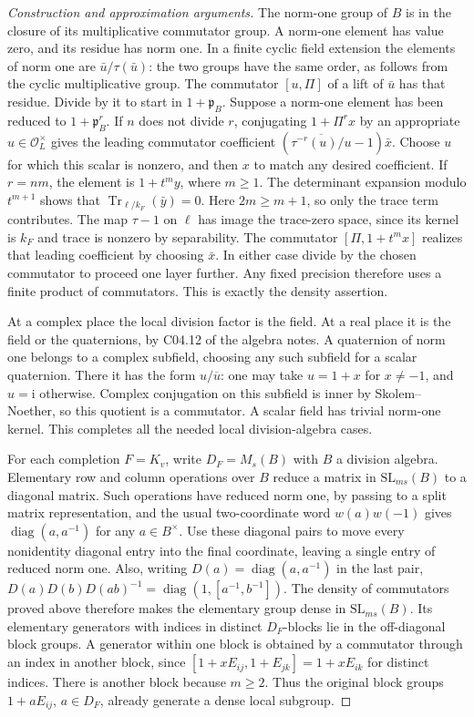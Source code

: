 \documentclass[11pt,a4paper,openany,oneside]{book}
\theoremstyle{resultstyle}
\theoremstyle{definition}
\numberwithin{equation}{chapter}
\newcommand{\SL}{\mathrm{SL}}
\begin{document}
\begin{proof}[Construction and approximation arguments]
The norm-one group of \(B\) is in the closure of its
multiplicative commutator group. A norm-one element has
value zero, and its residue has norm one. In a finite
cyclic field extension the elements of norm one are
\(\bar u/\tau(\bar u)\): the two groups have the same
order, as follows from the cyclic multiplicative group.
The commutator \([u,\Pi]\) of a lift of \(\bar u\)
has that residue. Divide by it to start in
\(1+\mathfrak p_B\). Suppose a norm-one element has
been reduced to \(1+\mathfrak p_B^r\). If \(n\) does
not divide \(r\), conjugating \(1+\Pi^r x\) by an
appropriate \(u\in\mathcal O_L^\times\) gives the
leading commutator coefficient
\((\overline{\tau^{-r}(u)/u}-1)\bar x\).
Choose \(u\) for which this scalar is nonzero, and then
\(x\) to match any desired coefficient.
If \(r=nm\), the element is \(1+t^m y\), where \(m\ge1\).
The determinant expansion modulo \(t^{m+1}\) shows that
\(\operatorname{Tr}_{\ell/k_F}(\bar y)=0\).
Here \(2m\ge m+1\), so only the trace term contributes.
The map \(\tau-1\) on \(\ell\) has image the trace-zero
space, since its kernel is \(k_F\) and trace is nonzero
by separability. The commutator \([\Pi,1+t^m x]\)
realizes that leading coefficient by choosing \(\bar x\).
In either case divide by the chosen commutator to proceed
one layer further. Any fixed precision therefore uses a
finite product of commutators. This is exactly the
density assertion.

At a complex place the local division factor is the field.
At a real place it is the field or the quaternions, by
C04.12 of the algebra notes. A quaternion of norm one
belongs to a complex subfield, choosing any such subfield
for a scalar quaternion. There it has the form
\(u/\overline u\): one may take \(u=1+x\) for \(x\ne-1\),
and \(u=\mathrm i\) otherwise. Complex conjugation on
this subfield is inner by Skolem--Noether, so this
quotient is a commutator. A scalar field has trivial
norm-one kernel. This completes all the needed local
division-algebra cases.

For each completion \(F=K_v\), write \(D_F=M_s(B)\) with
\(B\) a division algebra. Elementary row and column
operations over \(B\) reduce a matrix in \(\SL_{ms}(B)\)
to a diagonal matrix. Such operations have reduced norm
one, by passing to a split matrix representation, and
the usual two-coordinate word \(w(a)w(-1)\) gives
\(\operatorname{diag}(a,a^{-1})\) for any \(a\in B^\times\).
Use these diagonal pairs to move every nonidentity
diagonal entry into the final coordinate, leaving a
single entry of reduced norm one. Also, writing
\(D(a)=\operatorname{diag}(a,a^{-1})\) in the last pair,
\(D(a)D(b)D(ab)^{-1}=\operatorname{diag}(1,[a^{-1},b^{-1}])\).
The density of commutators proved above therefore makes
the elementary group dense in \(\SL_{ms}(B)\).
Its elementary generators with indices in distinct
\(D_F\)-blocks lie in the off-diagonal block groups.
A generator within one block is obtained by a commutator
through an index in another block, since
\([1+xE_{ij},1+E_{jk}]=1+xE_{ik}\) for distinct indices.
There is another block because \(m\ge2\).
Thus the original block groups \(1+aE_{ij}\), \(a\in D_F\),
already generate a dense local subgroup.


\end{proof}
\end{document}

